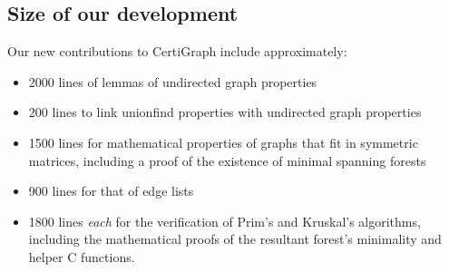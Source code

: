 \subsection{Size of our development}
Our new contributions to CertiGraph include approximately:
\begin{itemize}
\item2000 lines of lemmas of undirected graph properties
\item200 lines to link unionfind properties with undirected graph properties
\item1500 lines for mathematical properties of graphs that fit in symmetric matrices, including a proof of the existence of minimal spanning forests
\item900 lines for that of edge lists
\item1800 lines \textit{each} for the verification of Prim's and Kruskal's algorithms, including the mathematical proofs of the resultant forest's minimality and helper C functions.
\end{itemize} 